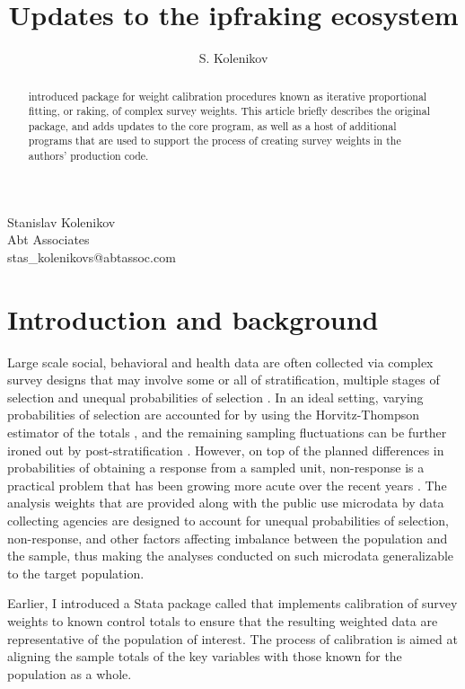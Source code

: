 \author{S. Kolenikov}{%
  Stanislav Kolenikov\\Abt Associates\\stas\_kolenikovs@abtassoc.com
}
\title[Raking survey data: updates]{Updates to the ipfraking ecosystem}
\maketitle

\begin{abstract}
\citet{kolenikov:2014} introduced package  
for weight calibration procedures known as iterative proportional fitting,
or raking, of complex survey weights.
This article briefly describes the original package,
and adds updates to the core program, as well as a host of
additional programs that are used to support the process of creating
survey weights in the authors' production code.

\end{abstract}

\section{Introduction and background}

Large scale social, behavioral and health data are often collected
via complex survey designs that may involve some or all of stratification,
multiple stages of selection and unequal probabilities of selection
\citep{korn:graubard:1995,korn:graubard:1999}.
In an ideal setting, varying probabilities of selection are
accounted for by using the Horvitz-Thompson estimator of the totals
\citep{horvitz:thompson:1952,thompson:1997}, and the remaining
sampling fluctuations can be further ironed out by
post-stratification \citep{holt:smith:1979}.
However, on top of the planned differences in probabilities of obtaining
a response from a sampled unit, non-response is a practical problem
that has been growing more acute over the recent years
\citep{groves:dillman:eltinge:little:2001,pew:2012}.
The analysis weights that are provided along with the public use
microdata by data collecting agencies are designed to account
for unequal probabilities of selection, non-response, and other factors
affecting imbalance between the population and the sample, thus making
the analyses conducted on such microdata generalizable to the target population.

Earlier, I introduced \citep{kolenikov:2014} a Stata package
called  that implements
calibration of survey weights to known control totals to ensure
that the resulting weighted data are representative of the population
of interest. The process of calibration is aimed at aligning the sample totals
of the key variables with those known for the population as a whole.

